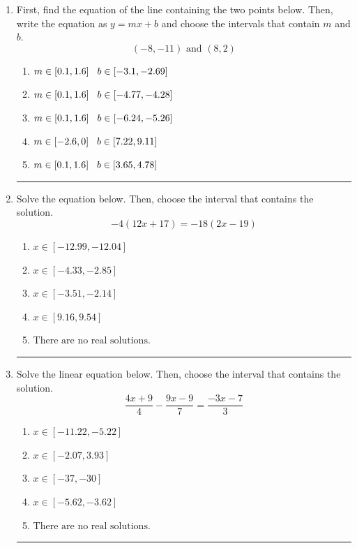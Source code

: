 \documentclass[14pt]{extbook}
\newcommand{\litem}[1]{\item#1\hspace*{-1cm}\rule{\textwidth}{0.4pt}}
\begin{document}
\begin{enumerate}
{\begin{enumerate}[label=\Alph*.]
\end{enumerate} }
\litem{
First, find the equation of the line containing the two points below. Then, write the equation as $ y=mx+b $ and choose the intervals that contain $m$ and $b$.\[ (-8, -11) \text{ and } (8, 2) \]\begin{enumerate}[label=\Alph*.]
\item \( m \in [0.1, 1.6] \hspace*{3mm} b \in [-3.1, -2.69] \)
\item \( m \in [0.1, 1.6] \hspace*{3mm} b \in [-4.77, -4.28] \)
\item \( m \in [0.1, 1.6] \hspace*{3mm} b \in [-6.24, -5.26] \)
\item \( m \in [-2.6, 0] \hspace*{3mm} b \in [7.22, 9.11] \)
\item \( m \in [0.1, 1.6] \hspace*{3mm} b \in [3.65, 4.78] \)

\end{enumerate} }
\litem{
Solve the equation below. Then, choose the interval that contains the solution.\[ -4(12x + 17) = -18(2x -19) \]\begin{enumerate}[label=\Alph*.]
\item \( x \in [-12.99, -12.04] \)
\item \( x \in [-4.33, -2.85] \)
\item \( x \in [-3.51, -2.14] \)
\item \( x \in [9.16, 9.54] \)
\item \( \text{There are no real solutions.} \)

\end{enumerate} }
\litem{
Solve the linear equation below. Then, choose the interval that contains the solution.\[ \frac{4x + 9}{4} - \frac{9x -9}{7} = \frac{-3x -7}{3} \]\begin{enumerate}[label=\Alph*.]
\item \( x \in [-11.22, -5.22] \)
\item \( x \in [-2.07, 3.93] \)
\item \( x \in [-37, -30] \)
\item \( x \in [-5.62, -3.62] \)
\item \( \text{There are no real solutions.} \)


\end{enumerate}}
\end{enumerate}
\end{document}
